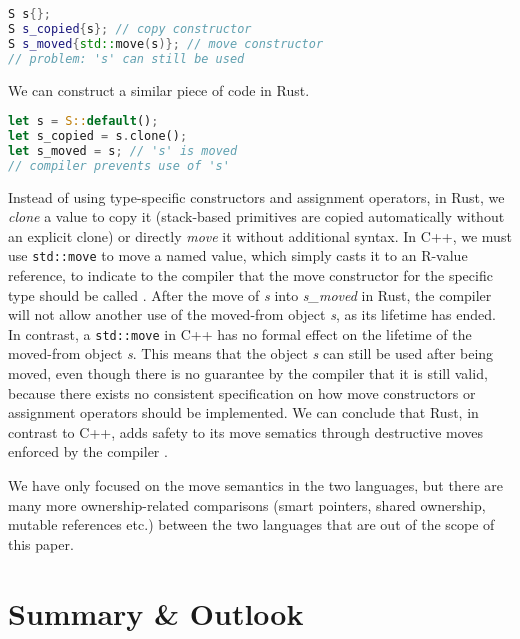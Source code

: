 \documentclass[sigplan,11pt,nonacm]{acmart}
\begin{document}
\begin{lstlisting}[language=C++]
S s{};
S s_copied{s}; // copy constructor
S s_moved{std::move(s)}; // move constructor
// problem: 's' can still be used
\end{lstlisting}

We can construct a similar piece of code in Rust.

\begin{lstlisting}[language=Rust]
let s = S::default();
let s_copied = s.clone();
let s_moved = s; // 's' is moved
// compiler prevents use of 's'
\end{lstlisting}

Instead of using type-specific constructors and assignment operators, in Rust, we \emph{clone} a value to copy it (stack-based primitives are copied automatically without an explicit clone) or directly \emph{move} it without additional syntax.
In C++, we must use \verb|std::move| to move a named value, which simply casts it to an R-value reference, to indicate to the compiler that the move constructor for the specific type should be called \cite{cpp-rust-ownership}.
After the move of \emph{s} into \emph{s\_moved} in Rust, the compiler will not allow another use of the moved-from object \emph{s}, as its lifetime has ended.
In contrast, a \verb|std::move| in C++ has no formal effect on the lifetime of the moved-from object \emph{s}.
This means that the object \emph{s} can still be used after being moved, even though there is no guarantee by the compiler that it is still valid, because there exists no consistent specification on how move constructors or assignment operators should be implemented.
We can conclude that Rust, in contrast to C++, adds safety to its move sematics through destructive moves enforced by the compiler \cite{cpp-rust-ownership}.

We have only focused on the move semantics in the two languages, but there are many more ownership-related comparisons (smart pointers, shared ownership, mutable references etc.) between the two languages that are out of the scope of this paper.


\section{Summary \& Outlook}
\label{sec:summary}
\end{document}

